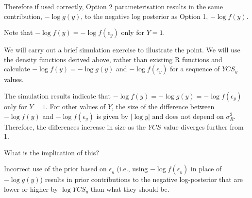\begin{appendices}
Therefore if used correctly, Option 2 parameterisation results in the same contribution, \(-\log g(y)\), to the negative log posterior as Option 1, \(-\log f(y)\).

Note that \(-\log f(y)=-\log f(\epsilon_y)\) only for \(Y=1\).

We will carry out a brief simulation exercise to illustrate the point. We will use the density functions derived above, rather than existing R functions and calculate \(-\log f(y) = -\log g(y)\) and \(-\log f(\epsilon_y)\) for a sequence of \(YCS_y\) values.

The simulation results indicate that \(-\log f(y) = -\log g(y) =-\log f(\epsilon_y)\) only for \(Y=1\). For other values of \(Y\), the size of the difference between \(-\log f(y)\) and \(-\log f(\epsilon_y)\) is given by \(\vert \log y\vert\) and does not depend on \(\sigma^2_R\). Therefore, the differences increase in size as the \(YCS\) value diverges further from 1.

What is the implication of this?

Incorrect use of the prior based on \(\epsilon_y\) (i.e., using \(-\log f(\epsilon_y)\) in place of \(-\log g(y)\)) results in prior contributions to the negative log-posterior that are lower or higher by \(\log YCS_y\) than what they should be.

\end{appendices}
